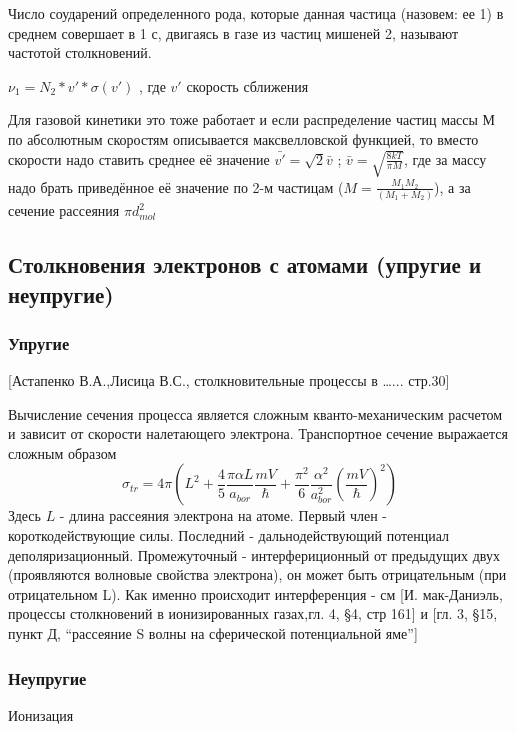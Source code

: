 \documentclass[10pt, a4paper]{article}
\begin{document}
Число соударений определенного рода, которые данная частица (назовем: ее 1) в среднем совершает в 1 с, двигаясь в газе из частиц мишеней 2, называют частотой столкновений.

$\nu_{1}=N_{2}*v'*\sigma (v')$
, где $v'$ скорость сближения

Для газовой кинетики это тоже работает и если распределение частиц массы М по абсолютным скоростям описывается максвелловской функцией, то вместо скорости надо ставить среднее её значение $\bar{v'}=\sqrt{2} \bar{v}$ ; $\bar{v}=\sqrt{\frac{8kT}{\pi M}}$, где за массу надо брать приведённое её значение по 2-м частицам ($ M=\frac{M_{1} M_{2}}{(M_{1}+M_{2})} $), а за сечение рассеяния $\pi d_{mol}^{2} $

\subsection{Столкновения электронов с атомами (упругие и неупругие)}
\label{sec.2.3}


\subsubsection{Упругие}
\label{sec.2.3.1}
[Астапенко В.А.,Лисица В.С., столкновительные процессы в …... стр.30]


Вычисление сечения процесса является сложным кванто-механическим расчетом и зависит от скорости налетающего электрона. Транспортное сечение выражается сложным образом
\begin{equation}
\sigma_{tr}=4\pi (L^{2}+\frac{4}{5}\frac{\pi \alpha L}{a_{bor}}\frac{mV}{\hbar}+\frac{\pi^{2}}{6}\frac{\alpha^{2}}{a_{bor}^{2}}(\frac{mV}{\hbar})^{2})
\end{equation}
Здесь $L$ - длина рассеяния электрона на атоме. Первый член - короткодействующие силы. Последний - дальнодействующий потенциал деполяризационный. Промежуточный - интерфериционный от предыдущих двух (проявляются волновые свойства электрона), он может быть отрицательным (при отрицательном L).
Как именно происходит интерференция - см [И. мак-Даниэль, процессы столкновений в ионизированных газах,гл. 4, §4, стр 161] и [гл. 3, §15, пункт Д, “рассеяние  S волны на сферической потенциальной яме”]

\subsubsection{Неупругие}
\label{sec.2.3.2}

Ионизация
\end{document}
